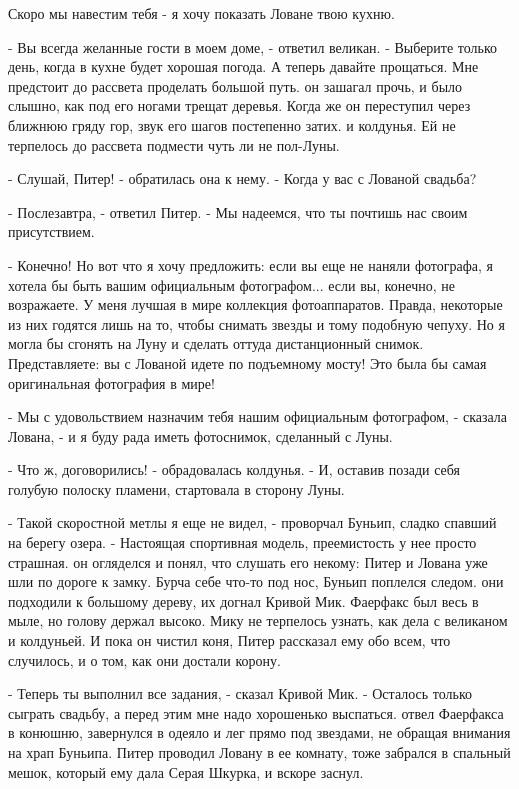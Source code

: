 Скоро мы навестим тебя - я хочу показать Ловане твою кухню.
\par- Вы всегда желанные гости в моем доме, - ответил великан. - 
Выберите только день, когда в кухне будет хорошая погода. А теперь 
давайте прощаться. Мне предстоит до рассвета проделать большой путь.
 он зашагал прочь, и было слышно, как под его ногами трещат 
деревья. Когда же он переступил через ближнюю гряду гор, звук его 
шагов постепенно затих.
 и колдунья. Ей не терпелось до рассвета подмести чуть 
ли не пол-Луны.
\par- Слушай, Питер! - обратилась она к нему. - Когда у вас с Лованой 
свадьба?
\par- Послезавтра, - ответил Питер. - Мы надеемся, что ты почтишь нас 
своим присутствием.
\par- Конечно! Но вот что я хочу предложить: если вы еще не наняли 
фотографа, я хотела бы быть вашим официальным фотографом... если вы, 
конечно, не возражаете. У меня лучшая в мире коллекция фотоаппаратов. 
Правда, некоторые из них годятся лишь на то, чтобы снимать звезды и 
тому подобную чепуху. Но я могла бы сгонять на Луну и сделать оттуда 
дистанционный снимок. Представляете: вы с Лованой идете по подъемному 
мосту! Это была бы самая оригинальная фотография в мире!
\par- Мы с удовольствием назначим тебя нашим официальным фотографом, - 
сказала Лована, - и я буду рада иметь фотоснимок, сделанный с Луны.
\par- Что ж, договорились! - обрадовалась колдунья. - И, оставив 
позади себя голубую полоску пламени, стартовала в сторону Луны.
\par- Такой скоростной метлы я еще не видел, - проворчал Буньип, 
сладко спавший на берегу озера. - Настоящая спортивная модель, 
преемистость у нее просто страшная.
 он огляделся и понял, что слушать его некому: Питер и Лована 
уже шли по дороге к замку. Бурча себе что-то под нос, Буньип поплелся 
следом.
 они подходили к большому дереву, их догнал Кривой Мик. 
Фаерфакс был весь в мыле, но голову держал высоко.
 Мику не терпелось узнать, как дела с великаном и 
колдуньей. И пока он чистил коня, Питер рассказал ему обо всем, что 
случилось, и о том, как они достали корону.
\par- Теперь ты выполнил все задания, - сказал Кривой Мик. - Осталось 
только сыграть свадьбу, а перед этим мне надо хорошенько выспаться.
 отвел Фаерфакса в конюшню, завернулся в одеяло и лег прямо под 
звездами, не обращая внимания на храп Буньипа. Питер проводил Ловану в 
ее комнату, тоже забрался в спальный мешок, который ему дала Серая 
Шкурка, и вскоре заснул.
